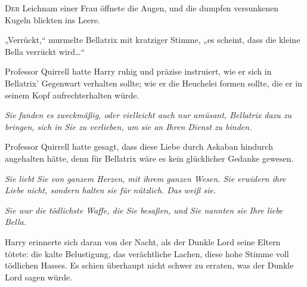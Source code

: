 
\lettrine{D}{er} Leichnam einer Frau öffnete die Augen, und die dumpfen versunkenen Kugeln blickten ins Leere.

„Verrückt,“ murmelte Bellatrix mit kratziger Stimme, „es scheint, dass die kleine Bella verrückt wird…“

Professor Quirrell hatte Harry ruhig und präzise instruiert, wie er sich in Bellatrix' Gegenwart verhalten sollte; wie er die Heuchelei formen sollte, die er in seinem Kopf aufrechterhalten würde.

\emph{Sie fanden es zweckmäßig, oder vielleicht auch nur amüsant, Bellatrix dazu zu bringen, sich in Sie zu verlieben, um sie an Ihren Dienst zu binden.}

Professor Quirrell hatte gesagt, dass diese Liebe durch Askaban hindurch angehalten hätte, denn für Bellatrix wäre es kein glücklicher Gedanke gewesen.

\emph{Sie liebt Sie von ganzem Herzen, mit ihrem ganzen Wesen. Sie erwidern ihre Liebe nicht, sondern halten sie für nützlich. Das weiß sie.}

\emph{Sie war die tödlichste Waffe, die Sie besaßen, und Sie nannten sie Ihre liebe Bella.}

Harry erinnerte sich daran von der Nacht, als der Dunkle Lord seine Eltern tötete: die kalte Belustigung, das verächtliche Lachen, diese hohe Stimme voll tödlichen Hasses. Es schien überhaupt nicht schwer zu erraten, was der Dunkle Lord sagen würde.

